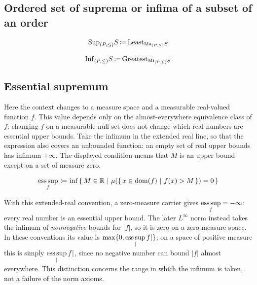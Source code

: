 \subsection{Ordered set of suprema or infima of a subset of an order}
\begin{definition}
\[
\mathrm{Sup}_{(P,\leq)}S\,{\coloneqq}\, \mathrm{Least}_{\mathrm{Ma}_{(P,\leq)}S}
\]
\end{definition}
\begin{definition}
\[
\mathrm{Inf}_{(P,\leq)}S\,{\coloneqq}\, \mathrm{Greatest}_{\mathrm{Mi}_{(P,\leq)}S}
\]
\end{definition}
\subsection{Essential supremum}
Here the context changes to a measure space and a measurable real-valued
function $f$. This value depends only on the almost-everywhere equivalence
class of $f$: changing $f$ on a measurable null set does not change which
real numbers are essential upper bounds. Take the infimum in the extended real line, so that the
expression also covers an unbounded function: an empty set of real upper
bounds has infimum $+\infty$. The displayed condition means that $M$ is an
upper bound except on a set of measure zero.

\begin{definition}
\[
\esssup f
\ceq
\inf
\cc{M\in\real}{\mu(\cc{x\in \dom(f)}{f(x)>M})=0}
\]
\end{definition}

With this extended-real convention, a zero-measure carrier gives
$\esssup f=-\infty$: every real number is an essential upper bound.
The later $L^\infty$ norm instead takes the infimum of \emph{nonnegative}
bounds for $|f|$, so it is zero on a zero-measure space. In these
conventions its value is $\max\{0,\esssup|f|\}$; on a space of
positive measure this is simply $\esssup|f|$, since no negative number
can bound $|f|$ almost everywhere. This distinction concerns the range
in which the infimum is taken, not a failure of the norm axioms.

